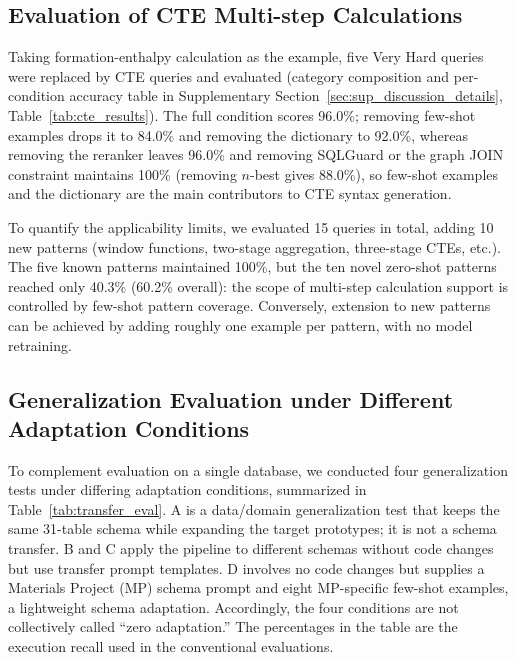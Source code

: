 \subsection{Evaluation of CTE Multi-step Calculations}
\label{sec:cte_eval}

Taking formation-enthalpy calculation as the example, five Very Hard queries were replaced by CTE queries and evaluated (category composition and per-condition accuracy table in Supplementary Section~\ref{sec:sup_discussion_details}, Table~\ref{tab:cte_results}). The full condition scores 96.0\%; removing few-shot examples drops it to 84.0\% and removing the dictionary to 92.0\%, whereas removing the reranker leaves 96.0\% and removing SQLGuard or the graph JOIN constraint maintains 100\% (removing $n$-best gives 88.0\%), so few-shot examples and the dictionary are the main contributors to CTE syntax generation.

To quantify the applicability limits, we evaluated 15 queries in total, adding 10 new patterns (window functions, two-stage aggregation, three-stage CTEs, etc.). The five known patterns maintained 100\%, but the ten novel zero-shot patterns reached only 40.3\% (60.2\% overall): the scope of multi-step calculation support is controlled by few-shot pattern coverage. Conversely, extension to new patterns can be achieved by adding roughly one example per pattern, with no model retraining.

\subsection{Generalization Evaluation under Different Adaptation Conditions}
\label{sec:transfer_eval}

To complement evaluation on a single database, we conducted four generalization tests under differing adaptation conditions, summarized in Table~\ref{tab:transfer_eval}. A is a data/domain generalization test that keeps the same 31-table schema while expanding the target prototypes; it is not a schema transfer. B and C apply the pipeline to different schemas without code changes but use transfer prompt templates. D involves no code changes but supplies a Materials Project (MP) schema prompt and eight MP-specific few-shot examples, a lightweight schema adaptation. Accordingly, the four conditions are not collectively called ``zero adaptation.'' The percentages in the table are the execution recall used in the conventional evaluations.

